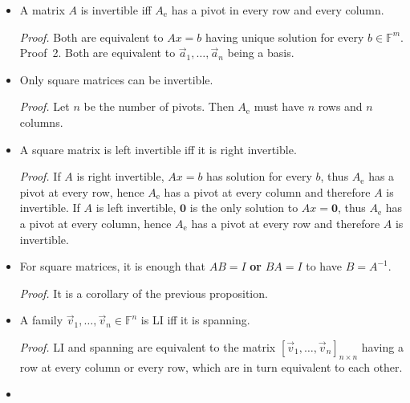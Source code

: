 \documentclass[11pt]{article}
\newcommand{\1}{\mathbf{1}}
\newcommand{\e}{{\mathrm{e}}}
\newcommand{\0}{\mathbf{0}}
\newcommand{\F}{\mathbb{F}}
\newcommand{\va}{\vec{a}}
\newcommand{\vv}{\vec{v}}
\newcommand{\spitem}{\item[$\circ$]}
\begin{document}
\begin{itemize}
\item

A matrix $A$ is invertible iff $A_\e$ has a pivot in every row and every column.

\emph{Proof.}
Both are equivalent to $Ax=b$ having unique solution for every $b \in \F^m$.
\\
Proof~2.
Both are equivalent to $\va_1,\dots,\va_n$ being a basis.

\item

Only square matrices can be invertible.

\emph{Proof.}
Let $n$ be the number of pivots. Then $A_\e$ must have $n$ rows and $n$ columns.

\item

A square matrix is left invertible iff it is right invertible.

\emph{Proof.}
If $A$ is right invertible,
$Ax=b$ has solution for every $b$,
thus $A_\e$ has a pivot at every row,
hence $A_\e$ has a pivot at every column and therefore $A$ is invertible.
If $A$ is left invertible,
$\0$ is the only solution to $Ax=\0$, 
thus $A_\e$ has a pivot at every column,
hence $A_\e$ has a pivot at every row and therefore $A$ is invertible.



\item

For square matrices, it is enough that $AB = I$ \textbf{or} $BA = I$ to have $B = A^{-1}$.

\emph{Proof.}
It is a corollary of the previous proposition.

\spitem

A family $\vv_1,\dots,\vv_n\in\F^n$ is LI iff it is spanning.

\emph{Proof.}
LI and spanning are equivalent to the matrix $[\vv_1,\dots,\vv_n]_{n \times n}$ having a row at every column or every row, which are in turn equivalent to each other.

\spitem


\end{itemize}
\end{document}

